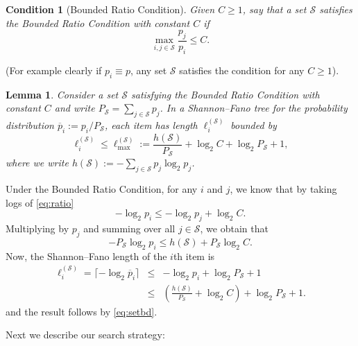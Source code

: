 \documentclass[conference]{IEEEtran}
\newcounter{eqn}
\newtheorem{lemma}[theorem]{Lemma}
\newtheorem{condition}{Condition}
\newcommand{\ol}[1]{\overline{#1}}
\newcommand{\setS}{{\mathcal{S}}}
\begin{document}
\begin{condition}[Bounded Ratio Condition] \label{cond:ratio}
Given $C \geq 1$, say that a set $\setS$ satisfies the Bounded Ratio Condition with constant $C$ if
\begin{equation} \label{eq:ratio} \max_{i,j \in \setS} \frac{p_j}{p_i} \leq C.\end{equation} \end{condition}
%
(For example clearly if $p_i \equiv p$, any set $\setS$ satisfies the condition for any $C \geq 1$).
%
\begin{lemma} \label{lem:sfstep}
Consider a set $\setS$ satisfying the Bounded Ratio Condition  with constant $C$
and write $P_{\setS} = \sum_{j \in \setS} p_j$.
In a  Shannon--Fano tree for the probability distribution $\ol{p}_i := p_i/P_{\setS}$, each item has length $\ell_i^{(\setS)}$
bounded by
\begin{equation} \label{eq:depth} \ell_i^{(\setS)} \leq \ell_{\max}^{(\setS)} := \frac{h(\setS)}{P_{\setS}} + \log_2  C + \log_2  P_{\setS} + 1,\end{equation}
where we write $h( \setS) :=  -\sum_{j \in \setS} p_j \log_2  p_j$.
\end{lemma}
\begin{IEEEproof}
Under the Bounded Ratio Condition, for any $i$ and $j$, we know that by taking logs of \eqref{eq:ratio}
$$ -\log_2 p_i \leq - \log_2 p_j + \log_2 C.$$
Multiplying by $p_j$ and summing over all $j \in \setS$, we obtain that
\begin{equation} \label{eq:setbd} -P_{\setS} \log_2 p_i \leq h(\setS) + P_{\setS} \log_2 C.\end{equation}
Now, the Shannon--Fano length of the $i$th item is
\begin{eqnarray}
 \ell_i^{(\setS)}  = \lceil -\log_2 \ol{p}_i \rceil 
& \leq &  -\log_2 p_i + \log_2 P_{\setS} + 1 \label{eq:lengthbd} \\
& \leq  & \left(\frac{h(\setS)}{P_{\setS}} + \log_2 C \right) + \log_2 P_{\setS} + 1. \nonumber
\end{eqnarray}
and the result follows by \eqref{eq:setbd}.
\end{IEEEproof}

Next we describe our search strategy:
\end{document}
